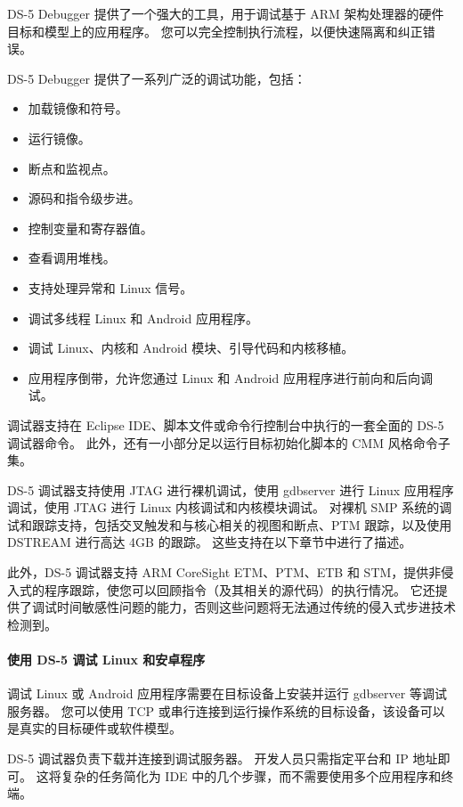 DS-5 Debugger 提供了一个强大的工具，用于调试基于 ARM 架构处理器的硬件目标和模型上的应用程序。
您可以完全控制执行流程，以便快速隔离和纠正错误。

DS-5 Debugger 提供了一系列广泛的调试功能，包括：

\begin{itemize}
\item
  加载镜像和符号。
\item
  运行镜像。
\item
  断点和监视点。
\item
  源码和指令级步进。
\item
  控制变量和寄存器值。
\item
  查看调用堆栈。
\item
  支持处理异常和 Linux 信号。
\item
  调试多线程 Linux 和 Android 应用程序。
\item
  调试 Linux、内核和 Android 模块、引导代码和内核移植。
\item
  应用程序倒带，允许您通过 Linux 和 Android 应用程序进行前向和后向调试。
\end{itemize}

调试器支持在 Eclipse IDE、脚本文件或命令行控制台中执行的一套全面的 DS-5 调试器命令。
此外，还有一小部分足以运行目标初始化脚本的 CMM 风格命令子集。

DS-5 调试器支持使用 JTAG 进行裸机调试，使用 gdbserver 进行 Linux 应用程序调试，使用 JTAG 进行 Linux 内核调试和内核模块调试。
对裸机 SMP 系统的调试和跟踪支持，包括交叉触发和与核心相关的视图和断点、PTM 跟踪，以及使用 DSTREAM 进行高达 4GB 的跟踪。
这些支持在以下章节中进行了描述。

此外，DS-5 调试器支持 ARM CoreSight ETM、PTM、ETB 和 STM，提供非侵入式的程序跟踪，使您可以回顾指令（及其相关的源代码）的执行情况。
它还提供了调试时间敏感性问题的能力，否则这些问题将无法通过传统的侵入式步进技术检测到。

\paragraph*{使用 DS-5 调试 Linux 和安卓程序}

调试 Linux 或 Android 应用程序需要在目标设备上安装并运行 gdbserver 等调试服务器。
您可以使用 TCP 或串行连接到运行操作系统的目标设备，该设备可以是真实的目标硬件或软件模型。

DS-5 调试器负责下载并连接到调试服务器。
开发人员只需指定平台和 IP 地址即可。
这将复杂的任务简化为 IDE 中的几个步骤，而不需要使用多个应用程序和终端。


